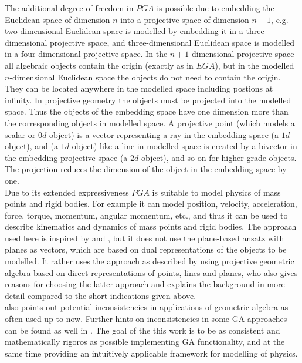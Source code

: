 The additional degree of freedom in $PGA$ is possible due to embedding the Euclidean space
of dimension $n$ into a projective space of dimension $n+1$, e.g. two-dimensional
Euclidean space is modelled by embedding it in a three-dimensional projective space, and
three-dimensional Euclidean space is modelled in a four-dimensional projective space. In
the $n+1$-dimensional projective space all algebraic objects contain the origin (exactly
as in $EGA$), but in the modelled $n$-dimensional Euclidean space the objects do not need
to contain the origin. They can be located anywhere in the modelled space including
postions at infinity. In projective geometry the objects must be projected into the
modelled space. Thus the objects of the embedding space have one dimension more than the
corresponding objects in modelled space. A projective point (which models a scalar or
$0d$-object) is a vector representing a ray in the embedding space (a $1d$-object), and (a
$1d$-object) like a line in modelled space is created by a bivector in the embedding
projective space (a $2d$-object), and so on for higher grade objects. The projection
reduces the dimension of the object in the embedding space by one. \\

Due to its extended expressiveness $PGA$ is suitable to model physics of mass points and
rigid bodies. For example it can model position, velocity, acceleration, force, torque,
momentum, angular momentum, etc., and thus it can be used to describe kinematics and
dynamics of mass points and rigid bodies. The approach used here is inspired by
\cite{Plane-based_PGA_Dorst-DeKennik:2022} and
\cite{Dynamics_in_PGA_plane-based_Dorst-DeKennik:2023}, but it does not use the
plane-based ansatz with planes as vectors, which are based on dual representations of the
objects to be modelled. It rather uses the approach as described by
\cite{Lengyel_pga-illuminated:2024} using projective geometric algebra based on direct
representations of points, lines and planes, who also gives reasons for choosing the
latter approach and explains the background in more detail compared to the short
indications given above. \\

\cite{Lengyel_poor-foundations_GA:2024} also points out potential inconsistencies in
applications of geometric algebra as often used up-to-now. Further hints on
inconsistencies in some GA approaches can be found as well in
\cite{Kritchevsky_case_against_GA:2024}. The goal of the this work is to be as consistent
and mathematically rigoros as possible implementing GA functionality, and at the same time
providing an intuitively applicable framework for modelling of physics. \\

